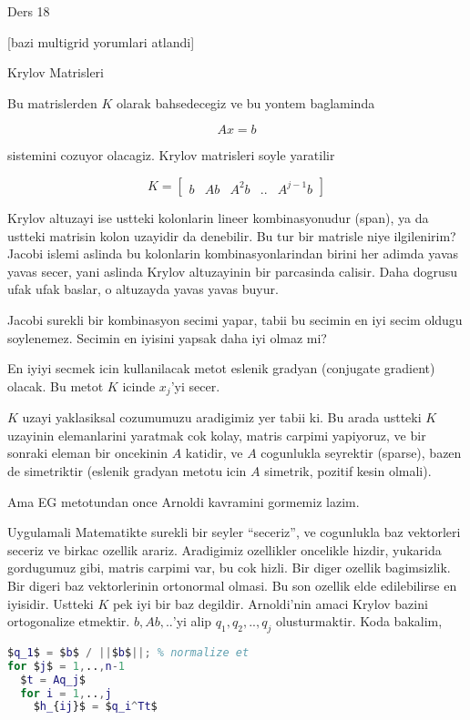 \documentclass[12pt,fleqn]{article}\usepackage{../common}
\begin{document}
Ders 18

[bazi multigrid yorumlari atlandi]

Krylov Matrisleri 

Bu matrislerden $K$ olarak bahsedecegiz ve bu yontem baglaminda 

\[ Ax = b \]

sistemini cozuyor olacagiz. Krylov matrisleri soyle yaratilir

\[ K = \left[\begin{array}{rrrrr}
b & Ab & A^2b & .. & A^{j-1}b
\end{array}\right] \]

Krylov altuzayi ise ustteki kolonlarin lineer kombinasyonudur (span), ya da
ustteki matrisin kolon uzayidir da denebilir. Bu tur bir matrisle niye
ilgilenirim? Jacobi islemi aslinda bu kolonlarin kombinasyonlarindan birini
her adimda yavas yavas secer, yani aslinda Krylov altuzayinin bir
parcasinda calisir. Daha dogrusu ufak ufak baslar, o altuzayda yavas yavas
buyur.

Jacobi surekli bir kombinasyon secimi yapar, tabii bu secimin en iyi secim
oldugu soylenemez. Secimin en iyisini yapsak daha iyi olmaz mi? 

En iyiyi secmek icin kullanilacak metot eslenik gradyan (conjugate
gradient) olacak. Bu metot $K$ icinde $x_j$'yi secer. 

$K$ uzayi yaklasiksal cozumumuzu aradigimiz yer tabii ki. Bu arada ustteki
$K$ uzayinin elemanlarini yaratmak cok kolay, matris carpimi yapiyoruz, ve
bir sonraki eleman bir oncekinin $A$ katidir, ve $A$ cogunlukla seyrektir
(sparse), bazen de simetriktir (eslenik gradyan metotu icin $A$ simetrik,
pozitif kesin olmali).

Ama EG metotundan once Arnoldi kavramini gormemiz lazim. 

Uygulamali Matematikte surekli bir seyler ``seceriz'', ve cogunlukla baz
vektorleri seceriz ve birkac ozellik arariz. Aradigimiz ozellikler
oncelikle hizdir, yukarida gordugumuz gibi, matris carpimi var, bu cok
hizli. Bir diger ozellik bagimsizlik. Bir digeri baz vektorlerinin
ortonormal olmasi. Bu son ozellik elde edilebilirse en iyisidir. Ustteki
$K$ pek iyi bir baz degildir. Arnoldi'nin amaci Krylov bazini ortogonalize
etmektir. $b,Ab,..$'yi alip $q_1,q_2,..,q_j$ olusturmaktir. Koda bakalim, 

\begin{lstlisting}[language=Matlab,mathescape]
$q_1$ = $b$ / ||$b$||; % normalize et
for $j$ = 1,..,n-1
  $t = Aq_j$
  for i = 1,..,j
    $h_{ij}$ = $q_i^Tt$ 
\end{lstlisting}
\end{document}
